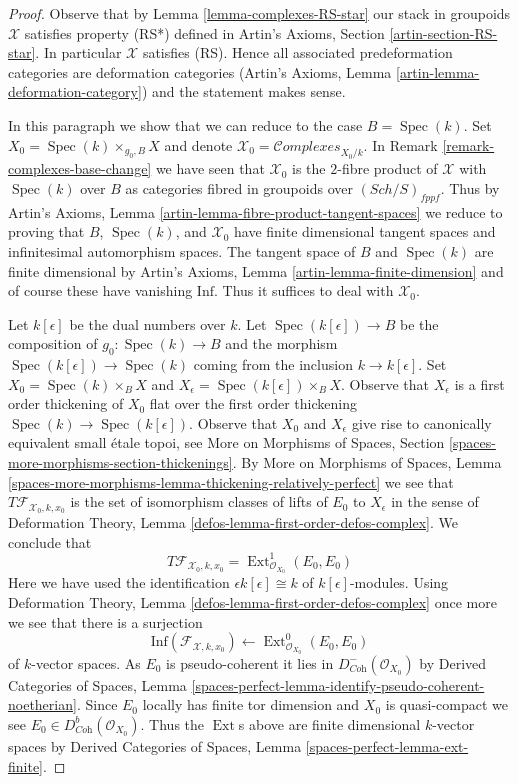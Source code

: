 \documentclass{stacks-project}
\theoremstyle{plain}
\theoremstyle{definition}
\theoremstyle{remark}
\numberwithin{equation}{subsection}
\def\Spec{\mathop{\mathrm{Spec}}}
\def\Ext{\mathop{\mathrm{Ext}}\nolimits}
\def\Sch{\mathit{Sch}}
\def\Complexesstack{\mathcal{C}\!\mathit{omplexes}}
\begin{document}
\begin{proof}
Observe that by Lemma \ref{lemma-complexes-RS-star}
our stack in groupoids $\mathcal{X}$ satisfies property (RS*)
defined in Artin's Axioms, Section \ref{artin-section-RS-star}.
In particular $\mathcal{X}$ satisfies (RS).
Hence all associated predeformation
categories are deformation categories
(Artin's Axioms, Lemma \ref{artin-lemma-deformation-category})
and the statement makes sense.

\medskip\noindent
In this paragraph we show that we can reduce to the case $B = \Spec(k)$.
Set $X_0 = \Spec(k) \times_{g_0, B} X$
and denote $\mathcal{X}_0 = \Complexesstack_{X_0/k}$. In
Remark \ref{remark-complexes-base-change} we have seen that
$\mathcal{X}_0$ is the $2$-fibre product of $\mathcal{X}$ with
$\Spec(k)$ over $B$ as categories fibred in groupoids over
$(\Sch/S)_{fppf}$. Thus by
Artin's Axioms, Lemma \ref{artin-lemma-fibre-product-tangent-spaces}
we reduce to proving that $B$, $\Spec(k)$, and $\mathcal{X}_0$
have finite dimensional tangent spaces and infinitesimal automorphism
spaces. The tangent space of $B$ and $\Spec(k)$ are finite dimensional by
Artin's Axioms, Lemma \ref{artin-lemma-finite-dimension}
and of course these have vanishing $\text{Inf}$.
Thus it suffices to deal with $\mathcal{X}_0$.

\medskip\noindent
Let $k[\epsilon]$ be the dual numbers over $k$.
Let $\Spec(k[\epsilon]) \to B$ be the composition of $g_0 : \Spec(k) \to B$
and the morphism $\Spec(k[\epsilon]) \to \Spec(k)$
coming from the inclusion $k \to k[\epsilon]$.
Set $X_0 = \Spec(k) \times_B X$ and
$X_\epsilon = \Spec(k[\epsilon]) \times_B X$.
Observe that $X_\epsilon$ is a first order thickening of $X_0$
flat over the first order thickening $\Spec(k) \to \Spec(k[\epsilon])$.
Observe that $X_0$ and $X_\epsilon$ give rise to canonically equivalent
small \'etale topoi, see
More on Morphisms of Spaces, Section
\ref{spaces-more-morphisms-section-thickenings}.
By More on Morphisms of Spaces, Lemma
\ref{spaces-more-morphisms-lemma-thickening-relatively-perfect}
we see that $T\mathcal{F}_{\mathcal{X}_0, k, x_0}$ is the set of
isomorphism classes of lifts of $E_0$ to $X_\epsilon$ in the sense of
Deformation Theory, Lemma \ref{defos-lemma-first-order-defos-complex}.
We conclude that
$$
T\mathcal{F}_{\mathcal{X}_0, k, x_0} =
\Ext^1_{\mathcal{O}_{X_0}}(E_0, E_0)
$$
Here we have used the identification $\epsilon k[\epsilon] \cong k$
of $k[\epsilon]$-modules. Using
Deformation Theory, Lemma \ref{defos-lemma-first-order-defos-complex}
once more we see that there is a surjection
$$
\text{Inf}(\mathcal{F}_{\mathcal{X}, k, x_0})
\leftarrow
\Ext^0_{\mathcal{O}_{X_0}}(E_0, E_0)
$$
of $k$-vector spaces. As $E_0$ is pseudo-coherent it lies in
$D^-_{\textit{Coh}}(\mathcal{O}_{X_0})$ by
Derived Categories of Spaces, Lemma
\ref{spaces-perfect-lemma-identify-pseudo-coherent-noetherian}.
Since $E_0$ locally has finite tor dimension and $X_0$
is quasi-compact we see $E_0 \in D^b_{\textit{Coh}}(\mathcal{O}_{X_0})$.
Thus the $\Ext$s above are finite dimensional $k$-vector spaces
by Derived Categories of Spaces, Lemma
\ref{spaces-perfect-lemma-ext-finite}.
\end{proof}
\end{document}
